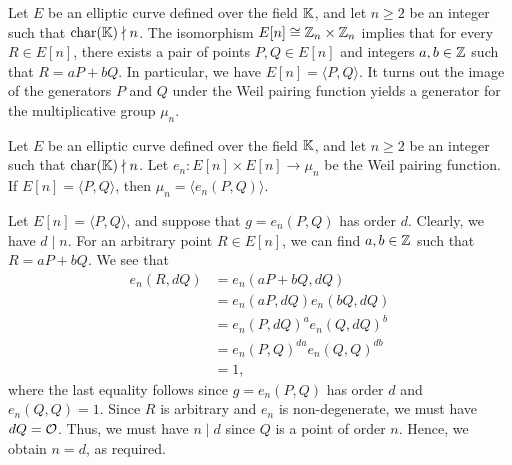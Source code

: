 Let $E$ be an elliptic curve defined over the field $\mathbb{K}$, and let $n \geq 2$ 
be an integer such that $\operatorname{char}(\mathbb{K}) \nmid n$. The isomorphism $E[n] 
\cong \mathbb{Z}_n \times \mathbb{Z}_n$ implies that for every $R \in E[n]$, there exists a 
pair of points $P, Q \in E[n]$ and integers $a, b \in \mathbb{Z}$ such that $R = aP + bQ$. In particular, we have 
$E[n] = \langle P, Q \rangle$. It turns out the image of the generators 
$P$ and $Q$ under the Weil pairing function yields a generator for the 
multiplicative group $\mu_n$. 

\begin{thm}
    Let $E$ be an elliptic curve defined over the field $\mathbb{K}$, and let 
    $n \geq 2$ be an integer such that $\operatorname{char}(\mathbb{K}) \nmid n$. Let 
    $e_n : E[n] \times E[n] \to \mu_n$ be the Weil pairing function. 
    If $E[n] = \langle P, Q \rangle$, then $\mu_n = \langle e_n(P, Q) \rangle$. 
\end{thm}
\begin{pf}
    Let $E[n] = \langle P, Q \rangle$, and suppose that $g = e_n(P, Q)$ 
    has order $d$. Clearly, we have $d \mid n$. For an arbitrary point 
    $R \in E[n]$, we can find $a, b \in \mathbb{Z}$ such that $R = aP + bQ$. 
    We see that 
    \begin{align*}
        e_n(R, dQ) &= e_n(aP + bQ, dQ) \\ 
        &= e_n(aP, dQ) e_n(bQ, dQ) \\ 
        &= e_n(P, dQ)^a e_n(Q, dQ)^b \\ 
        &= e_n(P, Q)^{da} e_n(Q, Q)^{db} \\ 
        &= 1,
    \end{align*}
    where the last equality follows since $g = e_n(P, Q)$ has order $d$ 
    and $e_n(Q, Q) = 1$. Since $R$ is arbitrary and $e_n$ is non-degenerate, 
    we must have $dQ = {\cal O}$. Thus, we must have $n \mid d$ since 
    $Q$ is a point of order $n$. Hence, we obtain $n = d$, as required. 
\end{pf}

